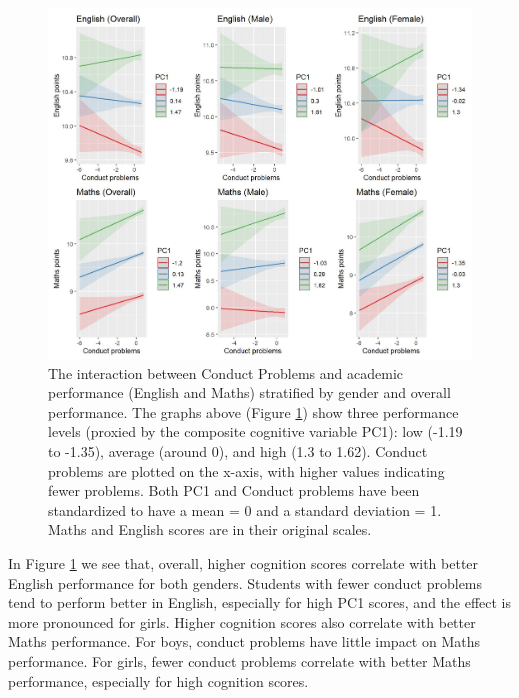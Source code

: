 \documentclass[12pt,a4paper,onecolumn]{article}
\numberwithin{equation}{section}
\begin{document}
\begin{figure}[ht] 
    \centering
    \includegraphics[width=1\linewidth]{AVE_SDQ_Conduct.JPG}
    \caption{The interaction between Conduct Problems and academic performance (English and Maths) stratified by gender and overall performance. The graphs above (Figure \ref{Fig1}) show three performance levels (proxied by the composite cognitive variable PC1): low (-1.19 to -1.35), average (around 0), and high (1.3 to 1.62). Conduct problems are plotted on the x-axis, with higher values indicating fewer problems. Both PC1 and Conduct problems have been standardized to have a mean = 0 and a standard deviation = 1. Maths and English scores are in their original scales.}
    \label{Fig1}
\end{figure}

In Figure \ref{Fig1} we see that, overall, higher cognition scores correlate with better English performance for both genders. Students with fewer conduct problems tend to perform better in English, especially for high PC1 scores, and the effect is more pronounced for girls. Higher cognition scores also correlate with better Maths performance. For boys, conduct problems have little impact on Maths performance.
For girls, fewer conduct problems correlate with better Maths performance, especially for high cognition scores.
\end{document}
